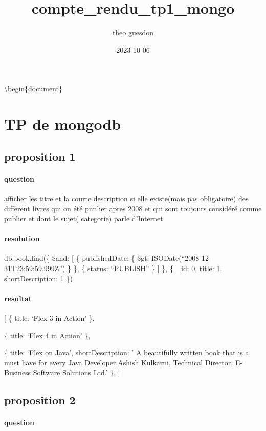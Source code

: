 \documentclass[
]{article}
\title{compte\_rendu\_tp1\_mongo}
\author{theo guesdon}
\date{2023-10-06}
\begin{document}
\maketitle

\textbackslash begin\{document\}

\section{TP de mongodb}

\subsection{proposition 1}
\paragraph{question}

afficher les titre et la courte description si elle existe(mais pas
obligatoire) des different livres qui on été punlier apres 2008 et qui
sont toujours considéré comme publier et dont le sujet( categorie) parle
d'Internet

\paragraph{resolution}

db.book.find(\{ \$and: {[} \{ publishedDate: \{ \$gt:
ISODate(``2008-12-31T23:59:59.999Z'') \} \}, \{ status: ``PUBLISH'' \}
{]} \}, \{ \_id: 0, title: 1, shortDescription: 1 \})

\paragraph{resultat}

{[} \{ title: `Flex 3 in Action' \},

\{ title: `Flex 4 in Action' \},

\{ title: `Flex on Java', shortDescription: ' A beautifully written book
that is a must have for every Java Developer.Ashish Kulkarni, Technical
Director, E-Business Software Solutions Ltd.' \}, {]}

\subsection{proposition 2}
\paragraph{question}
\end{document}
